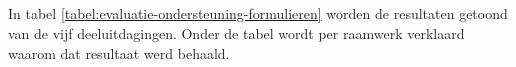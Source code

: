 % 
% 
% 

\subsection{}
\label{sec:evaluatie-ondersteuning-formulieren}

In tabel \ref{tabel:evaluatie-ondersteuning-formulieren} worden de resultaten getoond van de vijf deeluitdagingen.
Onder de tabel wordt per raamwerk verklaard waarom dat resultaat werd behaald.

